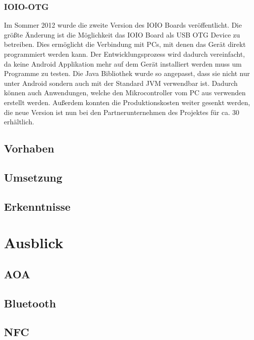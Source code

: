 \documentclass[12pt,journal,compsoc]{IEEEtran}
\begin{document}
\subsubsection{IOIO-OTG}
Im Sommer 2012 wurde die zweite Version des IOIO Boards veröffentlicht.
Die größte Änderung ist die Möglichkeit das IOIO Board als USB OTG Device zu betreiben.
Dies ermöglicht die Verbindung mit PCs, mit denen das Gerät direkt programmiert werden kann.
Der Entwicklungsprozess wird dadurch vereinfacht, da keine Android Applikation mehr auf dem Gerät installiert werden muss um Programme zu testen.
Die Java Bibliothek wurde so angepasst, dass sie nicht nur unter Android sondern auch mit der Standard JVM verwendbar ist. 
Dadurch können auch Anwendungen, welche den Mikrocontroller vom PC aus verwenden erstellt werden.
Außerdem konnten die Produktionskosten weiter gesenkt werden, die neue Version ist nun bei den Partnerunternehmen des Projektes für ca. 30\textdollar{} erhältlich.

\subsection{Vorhaben}

\subsection{Umsetzung}

\subsection{Erkenntnisse}





\section{Ausblick}
\subsection{AOA}

\subsection{Bluetooth}

\subsection{NFC}
\end{document}
